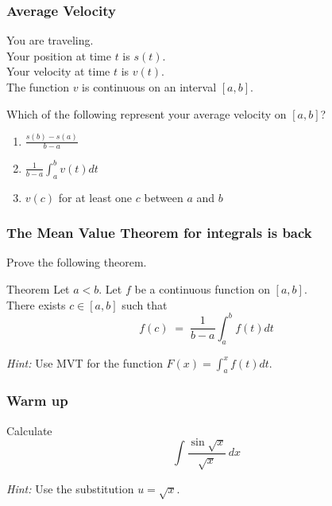 \documentclass[14pt]{beamer}
\begin{document}
\begin{frame}[t]
	\fontsize{13}{13}\selectfont
	\frametitle{Average Velocity}

	You are traveling. \\ Your position at time $t$ is $s(t)$. \\ Your velocity at
	time $t$ is $v(t)$. \\ The function $v$ is continuous on an interval $[a,b]$.

	Which of the following represent your average velocity on $[a,b]$?

	\begin{enumerate}
		\item $\displaystyle \frac{s(b) - s(a)}{b-a}$

		\item $\displaystyle \frac{1}{b-a}\int_{a}^{b}v(t) dt$

		\item $v(c)$ for at least one $c$ between $a$ and $b$
	\end{enumerate}
\end{frame}

\begin{frame}[t]
	\fontsize{13}{13}\selectfont
	\frametitle{The Mean Value Theorem for integrals is back}

	Prove the following theorem.

	\begin{block}{\fontsize{13}{13}\selectfont Theorem}
		Let $a < b$. Let $f$ be a continuous function on $[a,b]$. \\ There exists $c
		\in [a,b]$ such that
		\vspace{-.5cm}
		\[
			f(c) \; = \; \frac{1}{b-a}\int_{a}^{b}f(t) dt
		\]
	\end{block}


	\emph{Hint:} Use MVT for the function
	$\displaystyle F(x) = \int_{a}^{x}f(t) dt$.
\end{frame}

\begin{frame}[t]
	\frametitle{Warm up}

	Calculate
	\[
		\int \frac{\sin \sqrt{x}}{\sqrt{x}}\, dx
	\]

	\emph{Hint:} Use the substitution $\displaystyle u=\sqrt{x}$.
\end{frame}
\end{document}

